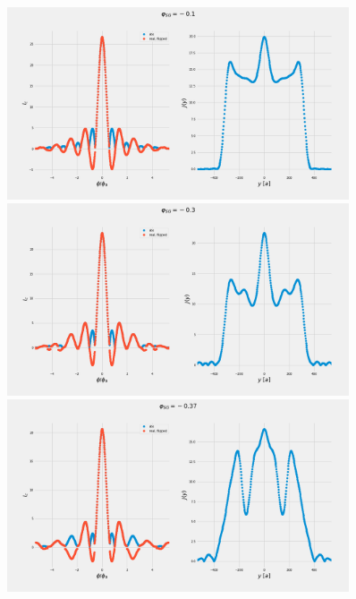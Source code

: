 \documentclass[a4paper]{article}
\begin{document}
\begin{figure}
	\includegraphics[width=0.9\textwidth]{figs/wg31/current_and_density_01}
	\includegraphics[width=0.9\textwidth]{figs/wg31/current_and_density_03}
	\includegraphics[width=0.9\textwidth]{figs/wg31/current_and_density_037}
\end{figure}
\end{document}
